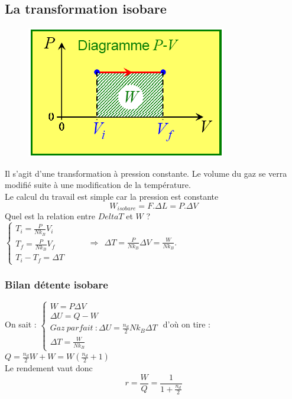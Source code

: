 \documentclass	[11pt, a4paper, openany]{book}
\begin{document}
\subsection{La transformation isobare}
\begin{figure}
\includegraphics[scale=0.34]{th/image10.png}
\end{figure}
Il s'agit d'une transformation à pression constante. Le volume du gaz se verra modifié suite à une modification de la température. \\
Le calcul du travail est simple car la pression est constante 
\begin{equation}
W_{isobare} = F.\Delta L = P. \Delta V
\end{equation}
Quel est la relation entre $Delta T$ et $W$ ?\\
$\left\{\begin{array}{l}
T_i =  \frac{P}{Nk_B}V_i\\
T_f = \frac{P}{Nk_B}V_f\\
T_i - T_f = \Delta T
\end{array}\right.$\ \ \ \ \ $\Rightarrow\ \ \Delta T = \frac{P}{Nk_B}\Delta V = \frac{W}{Nk_B}$.

\subsubsection{Bilan détente isobare}
On sait : $\left\{\begin{array}{l}
W = P\Delta V\\
\Delta U = Q - W\\
Gaz\ parfait\ : \Delta U = \frac{n_d}{2}Nk_B\Delta T\\
\Delta T = \frac{W}{Nk_B}
\end{array}\right.$ d'où on tire : $Q = \frac{n_d}{2}W + W = W(\frac{n_d}{2}+1)$\\
Le rendement vaut donc 
\begin{equation}
r = \frac{W}{Q} = \frac{1}{1 + \frac{n_d}{2}}
\end{equation}
\end{document}
